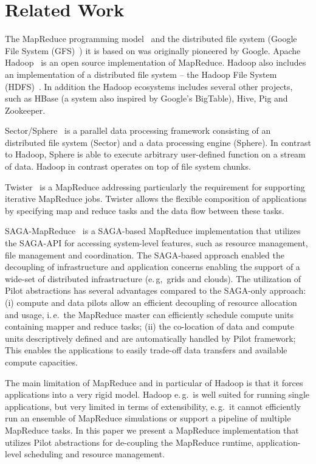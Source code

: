 \documentclass{acm_proc_article-sp}
\newcommand{\pilot}{Pilot\xspace}
\begin{document}
\section{Related Work}

The MapReduce programming model~\cite{Dean:2004:MSD:1251254.1251264} and the
distributed file system (Google File System
(GFS)~\cite{Ghemawat:2003:GFS:1165389.945450}) it is based on was originally
pioneered by Google. Apache Hadoop~\cite{hadoop} is an open source
implementation of MapReduce. Hadoop also includes an implementation of a
distributed file system -- the Hadoop File System
(HDFS)~\cite{Borthakur:2007fk}. In addition the Hadoop ecosystems includes
several other projects, such as HBase (a system also inspired by Google's
BigTable), Hive, Pig and Zookeeper.

Sector/Sphere~\cite{Gu_Grossman_2009} is a parallel data processing framework
consisting of an distributed file system (Sector) and a data processing engine
(Sphere). In contrast to Hadoop, Sphere is able to execute arbitrary 
user-defined function on a stream of data. Hadoop in contrast operates on top 
of file system chunks.

Twister~\cite{Ekanayake:2010:TRI:1851476.1851593} is a 
MapReduce addressing particularly the requirement for supporting iterative 
MapReduce jobs. Twister allows the flexible composition of applications by 
specifying map and reduce tasks and the data flow between these tasks. 


SAGA-MapReduce~\cite{Sehgal:2011:UAI:1945091.1945329} is a SAGA-based
MapReduce implementation that utilizes the SAGA-API for accessing system-level
features, such as resource management, file management and coordination. The
SAGA-based approach enabled the decoupling of infrastructure and application
concerns enabling the support of a wide-set of distributed infrastructure
(e.\,g,\ grids and clouds). The utilization of Pilot abstractions has several
advantages compared to the SAGA-only approach: (i) compute and data pilots
allow an efficient decoupling of resource allocation and usage, i.\,e.\ the
MapReduce master can efficiently schedule compute units containing mapper and
reduce tasks; (ii) the co-location of data and compute units descriptively
defined and are automatically handled by Pilot framework; This enables the
applications to easily trade-off data transfers and available compute
capacities.

The main limitation of MapReduce and in particular of Hadoop is that it forces
applications into a very rigid model. Hadoop e.\,g.\ is well suited for
running single applications, but very limited in terms of extensibility,
e.\,g.\ it cannot efficiently run an ensemble of MapReduce simulations or
support a pipeline of multiple MapReduce tasks. In this paper we present a 
MapReduce implementation that utilizes \pilot abstractions for de-coupling the MapReduce runtime, application-level scheduling and resource management.
\end{document}

